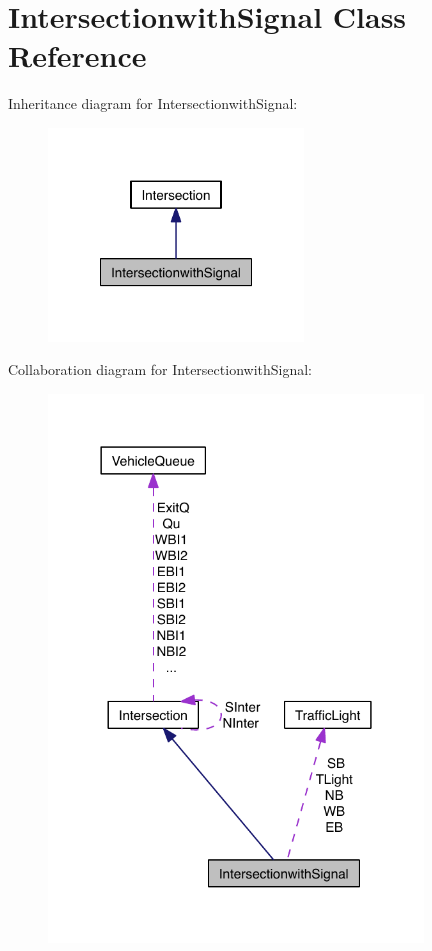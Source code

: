 \hypertarget{class_intersectionwith_signal}{\section{Intersectionwith\-Signal Class Reference}
\label{class_intersectionwith_signal}
}


Inheritance diagram for Intersectionwith\-Signal\-:\nopagebreak
\begin{figure}[H]
\begin{center}
\leavevmode
\includegraphics[width=192pt]{class_intersectionwith_signal__inherit__graph}
\end{center}
\end{figure}


Collaboration diagram for Intersectionwith\-Signal\-:\nopagebreak
\begin{figure}[H]
\begin{center}
\leavevmode
\includegraphics[width=282pt]{class_intersectionwith_signal__coll__graph}
\end{center}
\end{figure}
